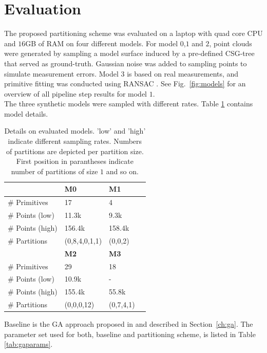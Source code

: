 \section{Evaluation}
\label{sec:eval}
The proposed partitioning scheme was evaluated on a laptop with quad core CPU and $16$GB of RAM on four different models.
For model $0$,$1$ and $2$, point clouds were generated by sampling a model surface induced by a pre-defined \ac{CSG}-tree that served as ground-truth. Gaussian noise was added to sampling points to simulate measurement errors.
Model $3$ is based on real measurements, and primitive fitting was conducted using RANSAC \cite{schnabel2007efficient}.
See Fig.~\ref{fig:models} for an overview of all pipeline step results for model $1$.
\\
The three synthetic models were sampled with different rates.
Table \ref{tab::models} contains model details. 
\begin{table}[h]
	\centering
	\begin{tabular}{|l|l|l|l|}
	\hline
	 & \textbf{M0} & \textbf{M1} \\
	\hline
	\# Primitives & 17 & 4  \\
	\hline
	\# Points (low) & 11.3k & 9.3k\\
	\hline
	\# Points (high) & 156.4k & 158.4k\\
	\hline
	\# Partitions & (0,8,4,0,1,1) & (0,0,2) \\
	\hline
	& \textbf{M2} & \textbf{M3} \\
	\hline
	\# Primitives & 29 & 18  \\
	\hline
	\# Points (low) & 10.9k & - \\
	\hline
	\# Points (high) & 155.4k & 55.8k \\
	\hline
	\# Partitions & (0,0,0,12) & (0,7,4,1) \\	
	\hline	
	\end{tabular}
	\caption{Details on evaluated models. 'low' and 'high' indicate different sampling rates. Numbers of partitions are depicted per partition size. First position in parantheses indicate number of partitions of size $1$ and so on.}
	\label{tab::models}
\end{table}
Baseline is the \ac{GA} approach proposed in \cite{fayolle2016evolutionary} and described in Section~\ref{ch:ga}. The parameter set used for both, baseline and partitioning scheme, is listed in Table \ref{tab:gaparams}.

